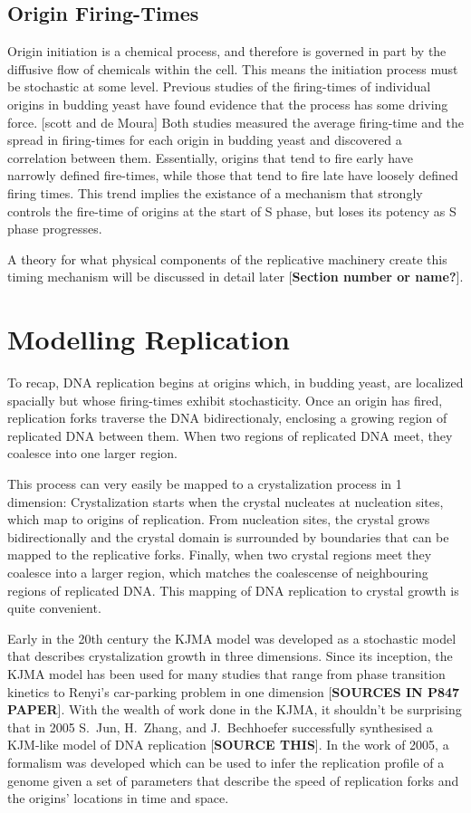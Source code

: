 		\subsection{Origin Firing-Times}
		
		Origin initiation is a chemical process, and therefore is governed in part by the diffusive flow of chemicals within the cell.
		This means the initiation process must be stochastic at some level.
		Previous studies of the firing-times of individual origins in budding yeast have found evidence that the process has some driving force. [scott and de Moura]
		Both studies measured the average firing-time and the spread in firing-times for each origin in budding yeast and discovered a correlation between them.
		Essentially, origins that tend to fire early have narrowly defined fire-times, while those that tend to fire late have loosely defined firing times.
		This trend implies the existance of a mechanism that strongly controls the fire-time of origins at the start of S phase, but loses its potency as S phase progresses.
		
		A theory for what physical components of the replicative machinery create this timing mechanism will be discussed in detail later [\textbf{Section number or name?}].
		
		
	\section{Modelling Replication}
	
	To recap, DNA replication begins at origins which, in budding yeast, are localized spacially but whose firing-times exhibit stochasticity.
	Once an origin has fired, replication forks traverse the DNA bidirectionaly, enclosing a growing region of replicated DNA between them.
	When two regions of replicated DNA meet, they coalesce into one larger region.
	
	This process can very easily be mapped to a crystalization process in 1 dimension:
	Crystalization starts when the crystal nucleates at nucleation sites, which map to origins of replication.
	From nucleation sites, the crystal grows bidirectionally and the crystal domain is surrounded by boundaries that can be mapped to the replicative forks.
	Finally, when two crystal regions meet they coalesce into a larger region, which matches the coalescense of neighbouring regions of replicated DNA.
	This mapping of DNA replication to crystal growth is quite convenient.
	
	Early in the 20th century the KJMA model was developed as a stochastic model that describes crystalization growth in three dimensions.
	Since its inception, the KJMA model has been used for many studies that range from phase transition kinetics to Renyi's car-parking problem in one dimension [\textbf{SOURCES IN P847 PAPER}].
	With the wealth of work done in the KJMA, it shouldn't be surprising that in 2005 S.~Jun, H.~Zhang, and J.~Bechhoefer successfully synthesised a KJM-like model of DNA replication [\textbf{SOURCE THIS}].
	In the work of 2005, a formalism was developed which can be used to infer the replication profile of a genome given a set of parameters that describe the speed of replication forks and the origins' locations in time and space.
	
